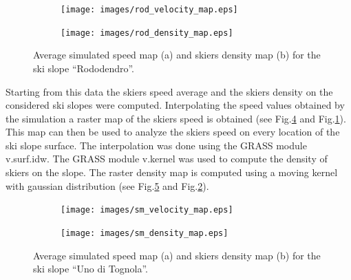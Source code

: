 \documentclass[12pt,a4paper,twoside]{book}
\begin{document}
\begin{figure}
        \centering
        \begin{subfigure}[b]{\textwidth}
                \centering
                \texttt{[image: images/rod\_velocity\_map.eps]}
                \caption{}\label{rododendro_vel}
        \end{subfigure}%

        \begin{subfigure}[b]{\textwidth}
                \centering
                \texttt{[image: images/rod\_density\_map.eps]}
                \caption{}\label{rododendro_den}
        \end{subfigure}
        \caption{Average simulated speed map (a) and skiers density map (b) for the ski slope ``Rododendro''.}\label{rododendro}
\end{figure}

Starting from this data the skiers speed average and the skiers density on the considered ski slopes were computed. Interpolating the speed values obtained by the simulation a raster map of the skiers speed is obtained (see Fig.\ref{uno_tognola_vel} and Fig.\ref{rododendro_vel}). This map can then be used to analyze the skiers speed on every location of the ski slope surface. The interpolation was done using the GRASS module v.surf.idw. The GRASS module v.kernel was used to compute the density of skiers on the slope. The raster density map is computed using a moving kernel with gaussian distribution (see Fig.\ref{uno_tognola_den} and Fig.\ref{rododendro_den}).

\begin{figure}
        \centering
        \begin{subfigure}[b]{\textwidth}
                \centering
                \texttt{[image: images/sm\_velocity\_map.eps]}
                \caption{}\label{uno_tognola_vel}
        \end{subfigure}%

        \begin{subfigure}[b]{\textwidth}
                \centering
                \texttt{[image: images/sm\_density\_map.eps]}
                \caption{}\label{uno_tognola_den}
        \end{subfigure}
        \caption{Average simulated speed map (a) and skiers density map (b) for the ski slope ``Uno di Tognola''.}\label{uno_tognola}
\end{figure}
\end{document}
